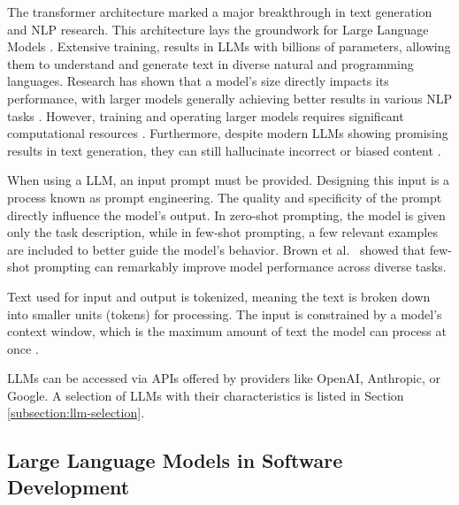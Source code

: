 The transformer architecture marked a major breakthrough in text generation and \ac{NLP} research.
This architecture lays the groundwork for Large Language Models \cite{changSurveyEvaluationLarge2024, naveedComprehensiveOverviewLarge2024}. Extensive training, results in \acp{LLM} with billions of parameters, allowing them to understand and generate text in diverse natural and programming languages. Research has shown that a model's size directly impacts its performance, with larger models generally achieving better results in various \ac{NLP} tasks \cite{kaplanScalingLawsNeural2020}. However, training and operating larger models requires significant computational resources \cite{LLMsWhatsLarge, naveedComprehensiveOverviewLarge2024}. Furthermore, despite modern \acp{LLM} showing promising results in text generation, they can still hallucinate incorrect or biased content \cite{LLMsWhatsLarge}.

When using a \ac{LLM}, an input prompt must be provided. Designing this input is a process known as prompt engineering. The quality and specificity of the prompt directly influence the model's output. In zero-shot prompting, the model is given only the task description, while in few-shot prompting, a few relevant examples are included to better guide the model's behavior. Brown et al.~\cite{brownLanguageModelsAre2020} showed that few-shot prompting can remarkably improve model performance across diverse tasks.

Text used for input and output is tokenized, meaning the text is broken down into smaller units (tokens) for processing. The input is constrained by a model's context window, which is the maximum amount of text the model can process at once \cite{naveedComprehensiveOverviewLarge2024}.

\acp{LLM} can be accessed via \acp{API} offered by providers like OpenAI, Anthropic, or Google. A selection of \acp{LLM} with their characteristics is listed in Section \ref{subsection:llm-selection}.

\subsection{Large Language Models in Software Development}

